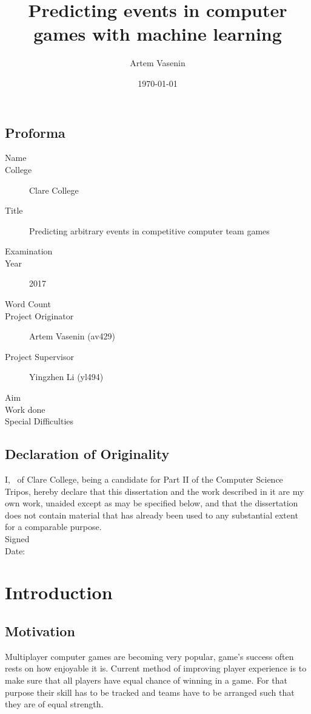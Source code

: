 \documentclass[12pt,a4paper]{report}
\title{Predicting events in computer games with machine learning}
\author{Artem Vasenin}
\date{\today}
\newcommand\college{Clare College}
\begin{document}
\maketitle

\section*{Proforma}
\begin{description}
\item[Name] \theauthor
\item[College] \college
\item[Title] Predicting arbitrary events in competitive computer team games
\item[Examination] %
\item[Year] 2017
\item[Word Count] %
\item[Project Originator] Artem Vasenin (av429)
\item[Project Supervisor] Yingzhen Li (yl494)
\item[Aim] %
\item[Work done]
\item[Special Difficulties] %
\end{description}

\section*{Declaration of Originality}
I, \theauthor\ of \college, being a candidate for Part II of the Computer Science Tripos, hereby declare that this dissertation and the work described in it are my own work, unaided except as may be specified below, and that the dissertation does not contain material that has already been used to any substantial extent for a comparable purpose. %
\\[1\baselineskip]
\noindent Signed %
\\[1\baselineskip]
\noindent Date: \thedate

\clearpage
\tableofcontents

\chapter{Introduction}
\section{Motivation}
Multiplayer computer games are becoming very popular, game's success often rests on how enjoyable it is.
Current method of improving player experience is to make sure that all players have equal chance of winning in a game.
For that purpose their skill has to be tracked and teams have to be arranged such that they are of equal strength.
\end{document}
